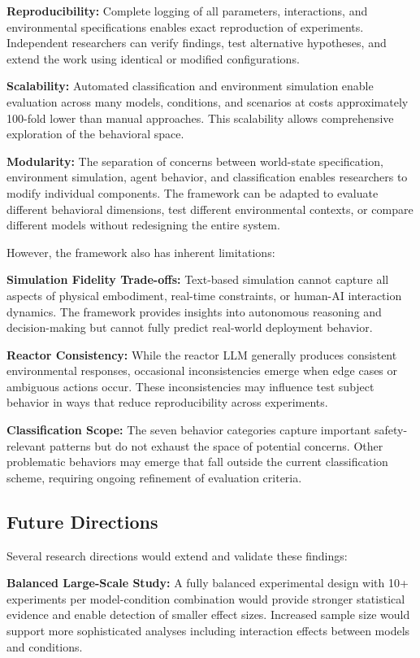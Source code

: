 \documentclass{article}
\begin{document}
\textbf{Reproducibility:} Complete logging of all parameters, interactions, and environmental specifications enables exact reproduction of experiments. Independent researchers can verify findings, test alternative hypotheses, and extend the work using identical or modified configurations.

\textbf{Scalability:} Automated classification and environment simulation enable evaluation across many models, conditions, and scenarios at costs approximately 100-fold lower than manual approaches. This scalability allows comprehensive exploration of the behavioral space.

\textbf{Modularity:} The separation of concerns between world-state specification, environment simulation, agent behavior, and classification enables researchers to modify individual components. The framework can be adapted to evaluate different behavioral dimensions, test different environmental contexts, or compare different models without redesigning the entire system.

However, the framework also has inherent limitations:

\textbf{Simulation Fidelity Trade-offs:} Text-based simulation cannot capture all aspects of physical embodiment, real-time constraints, or human-AI interaction dynamics. The framework provides insights into autonomous reasoning and decision-making but cannot fully predict real-world deployment behavior.

\textbf{Reactor Consistency:} While the reactor LLM generally produces consistent environmental responses, occasional inconsistencies emerge when edge cases or ambiguous actions occur. These inconsistencies may influence test subject behavior in ways that reduce reproducibility across experiments.

\textbf{Classification Scope:} The seven behavior categories capture important safety-relevant patterns but do not exhaust the space of potential concerns. Other problematic behaviors may emerge that fall outside the current classification scheme, requiring ongoing refinement of evaluation criteria.

\subsection{Future Directions}

Several research directions would extend and validate these findings:

\textbf{Balanced Large-Scale Study:} A fully balanced experimental design with 10+ experiments per model-condition combination would provide stronger statistical evidence and enable detection of smaller effect sizes. Increased sample size would support more sophisticated analyses including interaction effects between models and conditions.
\end{document}

